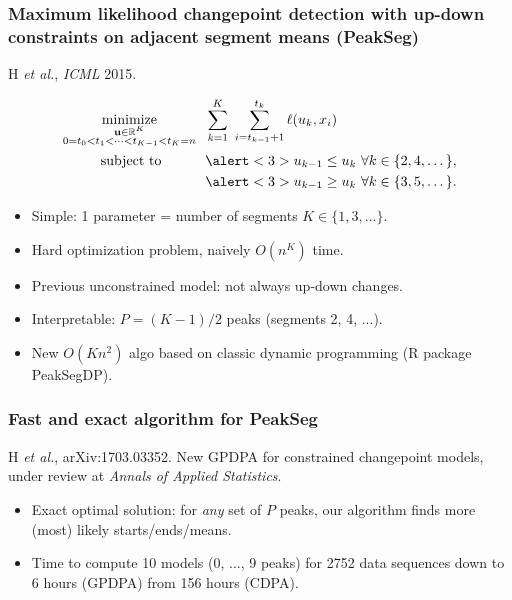 \documentclass{beamer}
\DeclareMathOperator*{\minimize}{minimize}
\newcommand{\RR}{\mathbb R}
\newcommand{\algo}[1]{\textcolor{#1}{#1}}
\begin{document}
\begin{frame}
  \frametitle{Maximum likelihood changepoint detection with up-down constraints on adjacent segment means (PeakSeg)}
H {\it et al.}, {\it ICML} 2015. 
   
\vskip -1.5cm
\begin{align*}
    \minimize_{\substack{
  \mathbf u\in\RR^{K}
\\
   0=t_0<t_1<\cdots<t_{K-1}<t_K=n
  }} &\ \ 
    \sum_{k=1}^K\  \sum_{i=t_{k-1}+1}^{t_k} \ell( u_k,  x_i) 
  \label{PeakSegPDPA}
\\
      \text{subject to \hskip 0.75cm} &\ \ \alert<3>{u_{k-1} \leq u_k\ \forall k\in\{2,4,\dots\},}
  \nonumber\\
  &\ \ \alert<3>{u_{k-1} \geq u_k\ \forall k\in\{3,5,\dots\}.}
  \nonumber 
\end{align*}
\vskip -0.4cm
\begin{itemize}  
\item Simple: 1 parameter = number of segments $K\in\{1,3,\dots\}$.
\item Hard optimization problem, naively $O(n^K)$ time.
\item \alert<2>{Previous unconstrained model: not always up-down changes.}
\item \alert<3>{Interpretable: $P=(K-1)/2$ peaks (segments 2, 4, ...).}
\item New $O(Kn^2)$ algo based on classic dynamic programming (R
  package PeakSegDP).
\end{itemize}
\end{frame} 


\begin{frame}
  \frametitle{Fast and exact algorithm for PeakSeg}
  H {\it et al.}, arXiv:1703.03352. New GPDPA for 
  constrained changepoint models, under review at {\it Annals of
    Applied Statistics}.
  \begin{itemize}
  \item Exact optimal solution: for \emph{any} set of $P$ peaks, our
    algorithm finds more (most) likely starts/ends/means.
  \item Time to compute 10 models (0, ..., 9 peaks) for 2752 data
    sequences down to \textcolor{GPDPA}{6 hours (GPDPA)} from
    \textcolor{CDPA}{156 hours (CDPA)}.
  \end{itemize}

  

\end{frame}
\end{document}

